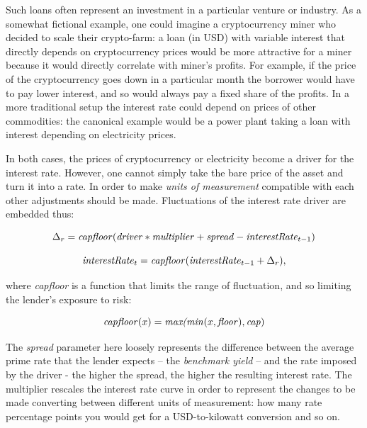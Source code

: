 \documentclass[runningheads]{llncs}
\newcommand{\ident}[1]{\mbox{\emph{#1}}}
\begin{document}
Such loans often represent an investment in a particular venture or industry. As
a somewhat fictional example, one could imagine a cryptocurrency miner
who decided to scale their crypto-farm: a loan (in USD) with variable
interest that directly depends on cryptocurrency prices would be more
attractive for a miner because it would directly correlate with miner's
profits. For example, if the price of the cryptocurrency goes down
in a particular month the borrower would have to pay lower interest, and so would always pay a fixed share of the profits. In a more traditional
setup the interest rate could depend on prices of other commodities: the canonical example would be a power plant taking a loan
with interest depending on electricity prices. 

In both cases, the prices of
cryptocurrency or electricity become a driver for the interest
rate.
However, one cannot simply take the bare price of the asset and turn
it into a rate. In order to make \emph{units of measurement} compatible with each other
adjustments should be made. Fluctuations of the interest rate driver
are embedded thus:



\noindent 
\begin{equation*}
\Delta_{r}=\ident{capfloor}(\ident{driver}*\ident{multiplier}+\ident{spread}-\ident{interestRate}_{t-1})
\end{equation*}

\noindent 
\begin{equation*}
\ident{interestRate}_{t}=\ident{capfloor}(\ident{interestRate}_{t-1}+\Delta_{r}),
\end{equation*}

\noindent
where \emph{capfloor} is a function that limits the range of fluctuation,  
and so limiting the lender's exposure to risk:

\noindent 
\begin{equation*}
\ident{capfloor}(x)=\ident{max(min}(x,\ident{floor}),\ident{cap})
\end{equation*}

\noindent
The \emph{spread} parameter here loosely represents the difference between
the average prime 
rate that the lender expects -- the \emph{benchmark yield} -- and
the rate imposed by the driver - the higher the spread, the higher
the resulting interest rate. The multiplier %
rescales the interest rate curve 
in order to represent the changes to be made converting between different units
of measurement: how many rate percentage points 
you would get for a USD-to-kilowatt conversion
and so on.
\end{document}
